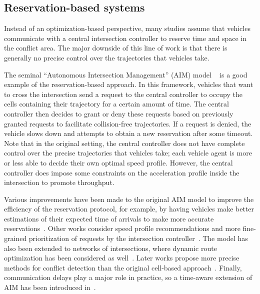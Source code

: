 \documentclass[a4paper]{report}
\theoremstyle{definition}
\theoremstyle{plain}
\begin{document}
\subsection{Reservation-based systems}

Instead of an optimization-based perspective, many studies assume that
vehicles communicate with a central intersection controller to reserve time and
space in the conflict area.
%
The major downside of this line of work is that there is generally no precise
control over the trajectories that vehicles take.

The seminal ``Autonomous Intersection Management'' (AIM) model ~\cite{dresnerMultiagentTrafficManagement2004,dresnerMultiagentApproachAutonomous2008} is a
good example of the reservation-based approach.
%
In this framework, vehicles that want to cross the intersection send a request
to the central controller to occupy the cells containing their trajectory for a
certain amount of time. The central controller then decides to grant or deny
these requests based on previously granted requests to facilitate collision-free
trajectories. If a request is denied, the vehicle slows down and attempts to
obtain a new reservation after some timeout.
%
Note that in the original setting, the central controller does not have complete
control over the precise trajectories that vehicles take; each vehicle agent is
more or less able to decide their own optimal speed profile.
%
However, the central controller does impose some constraints on the acceleration
profile inside the intersection to promote throughput.

Various improvements have been made to the original AIM model to improve the
efficiency of the reservation protocol, for example, by having vehicles make
better estimations of their expected time of arrivals to make more accurate
reservations~\cite{auMotionPlanningAlgorithms2010}.
%
Other works consider speed profile recommendations and more fine-grained
prioritization of requests by the intersection
controller~\cite{huangAssessingMobilityEnvironmental2012}.
%
The model has also been extended to networks of intersections, where dynamic
route optimization has been considered as well~\cite{hausknechtAutonomousIntersectionManagement2011}.
%
Later works propose more precise methods for conflict detection than the
original cell-based approach~\cite{levinConflictpointFormulationIntersection2017,liTemporalspatialDimensionExtensionbased2019}.
%
Finally, communication delays play a major role in practice, so a time-aware
extension of AIM has been introduced
in~\cite{khayatianCrossroadsTimeawareApproach2020}.
\end{document}
